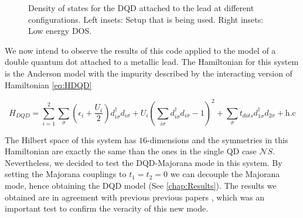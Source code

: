 \begin{figure}[bt]
    
     \caption{\label{fig:NRG-DQD} Density of states for the DQD attached to the lead at different configurations. Left insets: Setup that is being used. Right insets: Low energy DOS.  \protect\Source{ }}
\end{figure}


We now intend to observe the results of this code applied to the model of a double quantum dot attached to a metallic lead. The  Hamiltonian for this system is the Anderson model with the impurity described by the interacting version of Hamiltonian \eqref{eq:HDQD}

\begin{equation}
H_{DQD}=\sum_{i=1}^2\sum_\sigma \left( \epsilon_{i} + \frac{U_i}{2} \right) d_{i\sigma}^{\dagger}d_{i\sigma} + U_i\left(\sum_{i\sigma} d_{i\sigma}^{\dagger}d_{i\sigma} -1 \right)^2 + \sum_\sigma t_{dots}d_{1\sigma}^{\dagger}d_{2\sigma}+ \text{h.c}
\label{eq:interactingDQD}
\end{equation}

\noindent The Hilbert space of this system has $16$-dimensions and the symmetries in this Hamiltonian are exactly the same than the ones in the single QD case $\mathcal{N}S$. Nevertheless, we decided to test the DQD-Majorana mode in this system. By setting the Majorana couplings to $t_1=t_2= 0$ we can decouple the Majorana mode, hence obtaining the DQD model (See \ref{chap:Results}). The results we obtained are in agreement with previous previous papers \cite{dias_da_silva_transmission_2008}, which was an important test to confirm the veracity of this new mode. 

